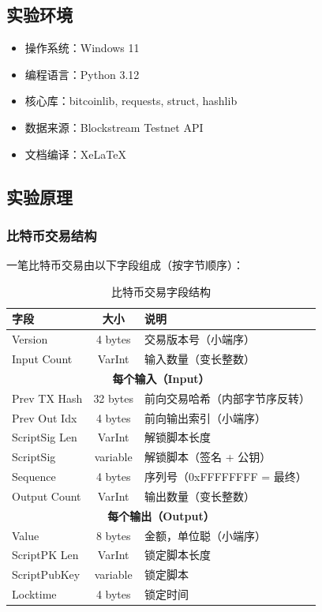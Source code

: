 \documentclass[12pt,a4paper]{ctexart}
\begin{document}
\subsection{实验环境}
\begin{itemize}
    \item 操作系统：Windows 11
    \item 编程语言：Python 3.12
    \item 核心库：bitcoinlib, requests, struct, hashlib
    \item 数据来源：Blockstream Testnet API
    \item 文档编译：XeLaTeX
\end{itemize}

\subsection{实验原理}

\subsubsection{比特币交易结构}
一笔比特币交易由以下字段组成（按字节顺序）：

\begin{table}[H]
\centering
\caption{比特币交易字段结构}
\begin{tabular}{|l|c|l|}
\hline
\textbf{字段} & \textbf{大小} & \textbf{说明} \\
\hline
Version       & 4 bytes   & 交易版本号（小端序） \\
Input Count   & VarInt    & 输入数量（变长整数） \\
\hline
\multicolumn{3}{|c|}{\textbf{每个输入（Input）}} \\
\hline
Prev TX Hash  & 32 bytes  & 前向交易哈希（内部字节序反转） \\
Prev Out Idx  & 4 bytes   & 前向输出索引（小端序） \\
ScriptSig Len & VarInt    & 解锁脚本长度 \\
ScriptSig     & variable  & 解锁脚本（签名 + 公钥） \\
Sequence      & 4 bytes   & 序列号（0xFFFFFFFF = 最终） \\
\hline
Output Count  & VarInt    & 输出数量（变长整数） \\
\hline
\multicolumn{3}{|c|}{\textbf{每个输出（Output）}} \\
\hline
Value         & 8 bytes   & 金额，单位聪（小端序） \\
ScriptPK Len  & VarInt    & 锁定脚本长度 \\
ScriptPubKey  & variable  & 锁定脚本 \\
\hline
Locktime      & 4 bytes   & 锁定时间 \\
\hline
\end{tabular}
\end{table}
\end{document}

